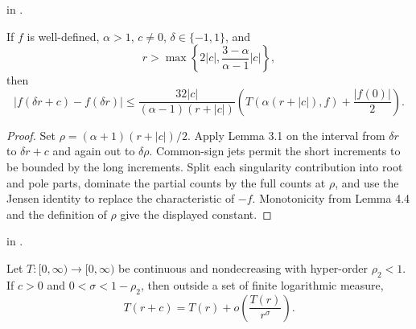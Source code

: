 \begin{leanproof}
 in
.
\end{leanproof}

\begin{lemma}
\leanok
{}
If $f$ is well-defined, $\alpha>1$, $c\neq0$, $\delta\in\{-1,1\}$, and
\[
 r>\max\left\{2|c|,\frac{3-\alpha}{\alpha-1}|c|\right\},
\]
then
\[
 |f(\delta r+c)-f(\delta r)|\leq
 \frac{32|c|}{(\alpha-1)(r+|c|)}
 \left(T(\alpha(r+|c|),f)+\frac{|f(0)|}{2}\right).
\]
\end{lemma}

\begin{proof}
\leanok
Set $\rho=(\alpha+1)(r+|c|)/2$.  Apply Lemma 3.1 on the interval from
$\delta r$ to $\delta r+c$ and again out to $\delta\rho$.  Common-sign jets
permit the short increments to be bounded by the long increments.  Split
each singularity contribution into root and pole parts, dominate the partial
counts by the full counts at $\rho$, and use the Jensen identity to replace
the characteristic of $-f$.  Monotonicity from Lemma 4.4 and the definition
of $\rho$ give the displayed constant.
\end{proof}

\begin{leanproof}
 in
.
\end{leanproof}

\begin{lemma}
\leanok
{}
Let $T:[0,\infty)\to[0,\infty)$ be continuous and nondecreasing with
hyper-order $\rho_2<1$.  If $c>0$ and $0<\sigma<1-\rho_2$, then outside a set
of finite logarithmic measure,
\[
                       T(r+c)=T(r)+o\!\left(\frac{T(r)}{r^\sigma}\right).
\]
\end{lemma}


